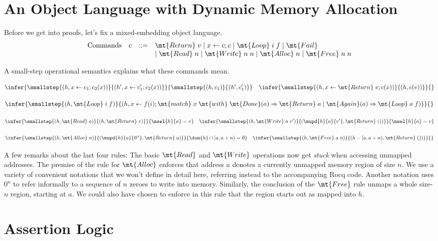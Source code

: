 \documentclass{amsbook}
\theoremstyle{definition}
\theoremstyle{remark}
\numberwithin{section}{chapter}
\numberwithin{equation}{chapter}
\begin{document}
\section{An Object Language with Dynamic Memory Allocation}

Before we get into proofs, let's fix a mixed-embedding object language.
$$\begin{array}{rrcl}
  \textrm{Commands} & c &::=& \mt{Return} \; v \mid x \leftarrow c; c \mid \mt{Loop} \; i \; f \mid \mt{Fail} \\
  &&& \mid \mt{Read} \; n \mid \mt{Write} \; n \; n \mid \mt{Alloc} \; n \mid \mt{Free} \; n \; n
\end{array}$$

A small-step operational semantics explains what these commands mean.

$$\infer{\smallstep{(h, x \leftarrow c_1; c_2(x))}{(h', x \leftarrow c'_1; c_2(x))}}{
  \smallstep{(h, c_1)}{(h', c'_1)}
}
\quad \infer{\smallstep{(h, x \leftarrow \mt{Return} \; v; c(x))}{(h, c(v))}}{}$$

$$\infer{\smallstep{(h, \mt{Loop} \; i \; f)}{(h, x \leftarrow f(i); \mt{match} \; x \; \mt{with} \; \mt{Done}(a) \Rightarrow \mt{Return} \; a \mid \mt{Again}(a) \Rightarrow \mt{Loop} \; a \; f)}}{}$$

$$\infer{\smallstep{(h, \mt{Read} \; a)}{(h, \mt{Return} \; v)}}{
  \msel{h}{a} = v
}
\quad \infer{\smallstep{(h, \mt{Write} \; a \; v')}{(\mupd{h}{a}{v'}, \mt{Return} \; ())}}{
  \msel{h}{a} = v
}$$

$$\infer{\smallstep{(h, \mt{Alloc} \; n)}{(\mupd{h}{a}{0^n}, \mt{Return} \; a)}}{
  \dom{h} \cap [a, a+n) = \emptyset
}
\quad \infer{\smallstep{(h, \mt{Free} \; a \; n)}{(h - [a, a+n), \mt{Return} \; ())}}{
}$$

A few remarks about the last four rules:
The basic $\mt{Read}$ and $\mt{Write}$ operations now get \emph{stuck} when accessing unmapped addresses.
The premise of the rule for $\mt{Alloc}$ enforces that address $a$ denotes a currently unmapped memory region of size $n$.
We use a variety of convenient notations that we won't define in detail here, referring instead to the accompanying Rocq code.
Another notation uses $0^n$ to refer informally to a sequence of $n$ zeroes to write into memory.
Similarly, the conclusion of the $\mt{Free}$ rule unmaps a whole size-$n$ region, starting at $a$.
We could also have chosen to enforce in this rule that the region starts out as mapped into $h$.

\section{Assertion Logic}
\end{document}
